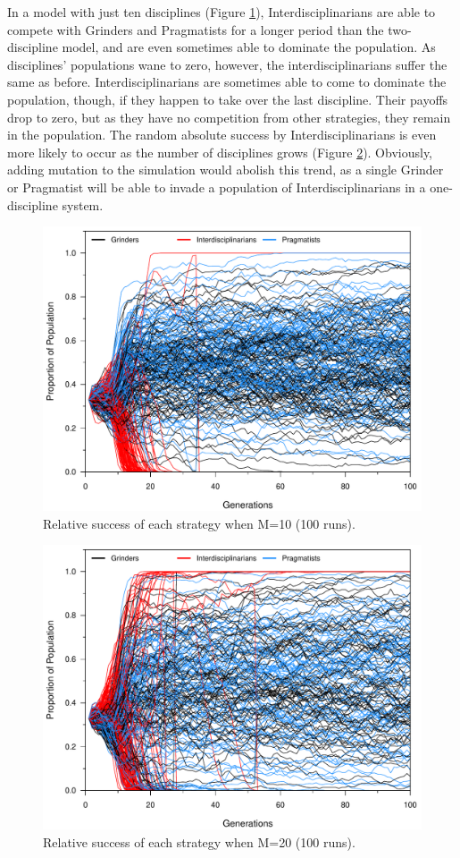 \documentclass[letterpaper]{article} %
\begin{document}
In a model with just ten disciplines (Figure \ref{fig:2}), Interdisciplinarians are able to compete with Grinders and Pragmatists for a longer period than the two-discipline model, and are even sometimes able to dominate the population. As disciplines' populations wane to zero, however, the interdisciplinarians suffer the same as before. Interdisciplinarians are sometimes able to come to dominate the population, though, if they happen to take over the last discipline. Their payoffs drop to zero, but as they have no competition from other strategies, they remain in the population. The random absolute success by Interdisciplinarians is even more likely to occur as the number of disciplines grows (Figure \ref{fig:3}). Obviously, adding mutation to the simulation would abolish this trend, as a single Grinder or Pragmatist will be able to invade a population of Interdisciplinarians in a one-discipline system.

\begin{figure}[H]
\centering
\small
\includegraphics{Grinders-003}
\caption{Relative success of each strategy when M=10 (100 runs).}
\label{fig:2}
\end{figure}

\begin{figure}[H]
\centering
\small
\includegraphics{Grinders-004}
\caption{Relative success of each strategy when M=20 (100 runs).}
\label{fig:3}
\end{figure}
\end{document}
